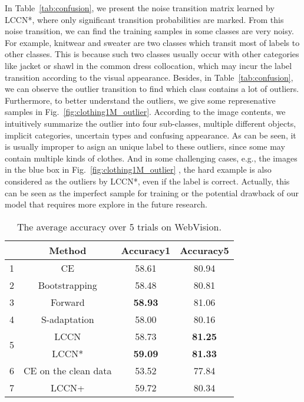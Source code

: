 \documentclass[journal]{IEEEtran}
\begin{document}
In Table~\ref{tab:confusion}, we present the noise transition matrix learned by LCCN*, where only significant transition probabilities are marked. From this noise transition, we can find the training samples in some classes are very noisy. For example, knitwear and sweater are two classes which transit most of labels to other classes. This is because such two classes usually occur with other categories like jacket or shawl in the common dress collocation, which may incur the label transition according to the visual appearance. Besides, in Table~\ref{tab:confusion}, we can observe the outlier transition to find which class contains a lot of outliers. Furthermore, to better understand the outliers, we give some represenative samples in Fig.~\ref{fig:clothing1M_outlier}. According to the image contents, we intuitively summarize the outlier into four sub-classes, multiple different objects, implicit categories, uncertain types and confusing appearance. As can be seen, it is usually improper to asign an unique label to these outliers, since some may contain multiple kinds of clothes. And in some challenging cases, e.g., the images in the blue box in Fig.~\ref{fig:clothing1M_outlier} , the hard example is also considered as the outliers by LCCN*, even if the label is correct. Actually, this can be seen as the imperfect sample for training or the potential drawback of our model that requires more explore in the future research. 


\begin{table}[ht]
\caption{The average accuracy over 5 trials on WebVision.}
\begin{center}
{\begin{tabular}{ c | c | c | c}
    \hline
      & Method & Accuracy1 & Accuracy5 \\
     \hline
     \hline
     1 & CE & 58.61 & 80.94 \\
     \hline
     2 & Bootstrapping & 58.48 & 80.81\\
     \hline
     3 & Forward & \textbf{58.93} & 81.06 \\
     \hline
     4 & S-adaptation & 58.00 & 80.16 \\
     \hline
     \multirow{2}{*}{5} & LCCN & 58.73 & \textbf{81.25} \\
     & LCCN* & \textbf{59.09}  & \textbf{81.33} \\
     \hline
     \hline
     6 & CE on the clean data & 53.52 & 77.84\\
     \hline
     7 & LCCN+ & 59.72 & 80.34\\
     \hline
    \end{tabular}
}
\end{center}
\label{tab:webvision}
\end{table}
\end{document}
